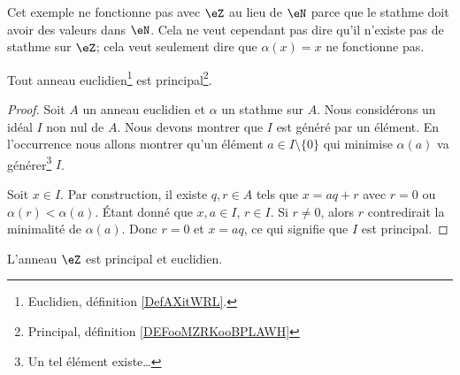 Cet exemple ne fonctionne pas avec \( \eZ\) au lieu de \( \eN\) parce que le stathme doit avoir des valeurs dans \( \eN\). Cela ne veut cependant pas dire qu'il n'existe pas de stathme sur \( \eZ\); cela veut seulement dire que \( \alpha(x)=x\) ne fonctionne pas.

\begin{proposition}\label{Propkllxnv}
    Tout anneau euclidien\footnote{Euclidien, définition \ref{DefAXitWRL}.} est principal\footnote{Principal, définition \ref{DEFooMZRKooBPLAWH}}.
\end{proposition}

\begin{proof}
	Soit \( A\) un anneau euclidien et \( \alpha\) un stathme sur \( A\). Nous considérons un idéal \( I\) non nul de \( A\). Nous devons montrer que \( I\) est généré par un élément. En l'occurrence nous allons montrer qu'un élément \( a\in I\setminus\{ 0 \}\) qui minimise \( \alpha(a)\) va générer\footnote{Un tel élément existe\dots} \( I\).

	Soit \( x\in I\). Par construction, il existe \( q,r\in A\) tels que \( x=aq+r\) avec \( r=0\) ou \( \alpha(r)<\alpha(a)\). Étant donné que \( x,a\in I\), \( r\in I\). Si \( r\neq 0\), alors \( r\) contredirait la minimalité de \( \alpha(a)\). Donc \( r=0\) et \( x=aq\), ce qui signifie que \( I\) est principal.
\end{proof}

\begin{proposition}     \label{PROPooPJGLooQSrJTU}
	L'anneau \( \eZ\) est principal et euclidien.
\end{proposition}

